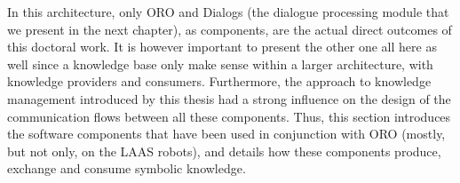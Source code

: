 In this architecture, only ORO and Dialogs (the dialogue processing module that
we present in the next chapter), as components, are the actual direct outcomes
of this doctoral work. It is however important to present the other one all
here as well since a knowledge base only make sense within a larger
architecture, with knowledge providers and consumers.  Furthermore, the
approach to knowledge management introduced by this thesis had a strong
influence on the design of the communication flows between all these
components. Thus, this section introduces the software components that have
been used in conjunction with ORO (mostly, but not only, on the LAAS robots),
and details how these components produce, exchange and consume symbolic
knowledge.


